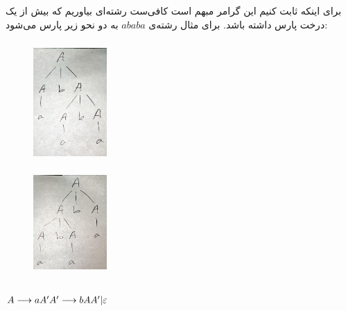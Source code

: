 \documentclass{article}
\begin{document}
\subsection{}
برای اینکه ثابت کنیم این گرامر مبهم است کافی‌ست رشته‌ای بیاوریم که بیش از یک درخت پارس داشته باشد. برای مثال رشته‌ی $a b a b a$ به دو نحو زیر پارس می‌شود:
\subsubsection{}
\begin{figure}[H]
    \centering
    \includegraphics[width=0.25\textwidth]{figures/c5.jpg}
    \caption
	{}
    \label{fig:fig1}
\end{figure}
\subsubsection{}
\begin{figure}[H]
    \centering
    \includegraphics[width=0.25\textwidth]{figures/c6.jpg}
    \caption
	{}
    \label{fig:fig1}
\end{figure}




\subsection{}
\begin{latin}
$
A \longrightarrow a A ^ \prime \\
A ^ \prime \longrightarrow b A A ^ \prime | \varepsilon
$
\end{latin}
\end{document}
